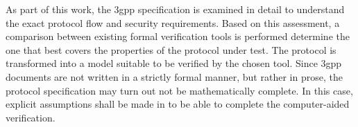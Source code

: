 As part of this work, the \gls{3gpp} specification is examined in detail to understand the exact protocol flow and security requirements.
Based on this assessment, a comparison between existing formal verification tools is performed determine the one that best covers the properties of the protocol under test.
The protocol is transformed into a model suitable to be verified by the chosen tool.
Since \gls{3gpp} documents are not written in a strictly formal manner, but rather in prose, the protocol specification may turn out not be mathematically complete.
In this case, explicit assumptions shall be made in to be able to complete the computer-aided verification.
